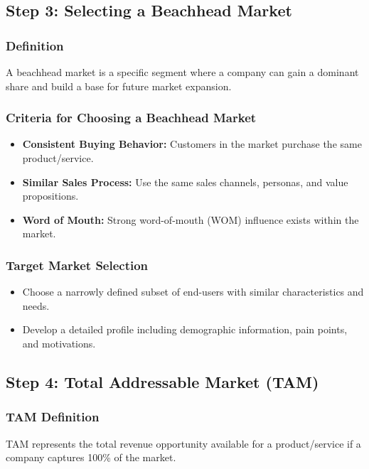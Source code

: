 \documentclass[a4paper,11pt]{article}
\begin{document}
\subsection{Step 3: Selecting a Beachhead Market}

\subsubsection{Definition}
A beachhead market is a specific segment where a company can gain a dominant share and build a base for future market expansion.

\subsubsection{Criteria for Choosing a Beachhead Market}
\begin{itemize}
    \item \textbf{Consistent Buying Behavior:} Customers in the market purchase the same product/service.
    \item \textbf{Similar Sales Process:} Use the same sales channels, personas, and value propositions.
    \item \textbf{Word of Mouth:} Strong word-of-mouth (WOM) influence exists within the market.
\end{itemize}

\subsubsection{Target Market Selection}
\begin{itemize}
    \item Choose a narrowly defined subset of end-users with similar characteristics and needs.
    \item Develop a detailed profile including demographic information, pain points, and motivations.
\end{itemize}

\subsection{Step 4: Total Addressable Market (TAM)}

\subsubsection{TAM Definition}
TAM represents the total revenue opportunity available for a product/service if a company captures 100\% of the market.
\end{document}
